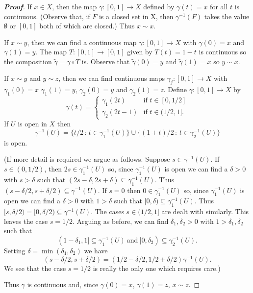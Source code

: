 \begin{proof}[\bf Proof]
If $x\in X$, then the map $\gamma:[0,1]\rightarrow X$ defined by
$\gamma(t)=x$ for all $t$ is continuous.
(Observe that, if $F$ is a closed set in X, then
$\gamma^{-1}(F)$ takes the value $\emptyset$
or $[0,1]$ both of which are closed.) Thus $x\sim x$.

If $x\sim y$, then we can find a continuous map
$\gamma:[0,1]\rightarrow X$ with $\gamma(0)=x$
and $\gamma(1)=y$. The map $T:[0,1]\rightarrow [0,1]$
given by $T(t)=1-t$ is continuous so the composition
$\tilde{\gamma}=\gamma\circ T$ is. Observe
that $\tilde{\gamma}(0)=y$ and $\tilde{\gamma}(1)=x$
so $y\sim x$.

If $x\sim y$ and $y\sim z$, then we can find  continuous maps
$\gamma_{j}:[0,1]\rightarrow X$ with $\gamma_{1}(0)=x$
$\gamma_{1}(1)=y$, $\gamma_{2}(0)=y$ and $\gamma_{2}(1)=z$.
Define $\gamma:[0,1]\rightarrow X$ by
\[
\gamma(t)=
\begin{cases}
\gamma_{1}(2t)&\text{if $t\in[0,1/2]$}\\
\gamma_{2}(2t-1)&\text{if $t\in(1/2,1]$}.
\end{cases}
\]
If $U$ is open in $X$ then
\[\gamma^{-1}(U)=\{t/2\,:\,t\in\gamma_{1}^{-1}(U)\}
\cup\{(1+t)/2\,:\,t\in\gamma_{2}^{-1}(U)\}\]
is open. 

(If more detail is required we argue as follows.
Suppose $s\in\gamma^{-1}(U)$. If $s\in(0,1/2)$,
then $2s\in \gamma_{1}^{-1}(U)$ so, since $\gamma_{1}^{-1}(U)$
is open we can find a $\delta>0$ with $s>\delta$
such that $(2s-\delta,2s+\delta)\subseteq \gamma_{1}^{-1}(U)$.
Thus $(s-\delta/2,s+\delta/2)\subseteq \gamma^{-1}(U)$.
If $s=0$ then $0\in\gamma_{1}^{-1}(U)$ so, since $\gamma_{1}^{-1}(U)$
is open we can find a $\delta>0$ with $1>\delta$ such that
$[0,\delta)\subseteq \gamma_{1}^{-1}(U)$. Thus
$[s,\delta/2)=[0,\delta/2)\subseteq \gamma^{-1}(U)$.
The cases $s\in(1/2,1]$ are dealt with similarly.
This leaves the case $s=1/2$. Arguing as before, we can find
$\delta_{1},\delta_{2}>0$ with $1>\delta_{1},\delta_{2}$
such that
\[(1-\delta_{1},1]\subseteq \gamma_{1}^{-1}(U)
\ \text{and}
\ [0,\delta_{2})\subseteq \gamma_{2}^{-1}(U).\]
Setting $\delta=\min(\delta_{1},\delta_{2})$ we have
\[(s-\delta/2,s+\delta/2)=(1/2-\delta/2,1/2+\delta/2)
\gamma^{-1}(U).\]
We see that the case $s=1/2$ is really the only one which requires
care.)

Thus $\gamma$ is continuous
and, since $\gamma(0)=x$, $\gamma(1)=z$, $x\sim z$.
\end{proof}



